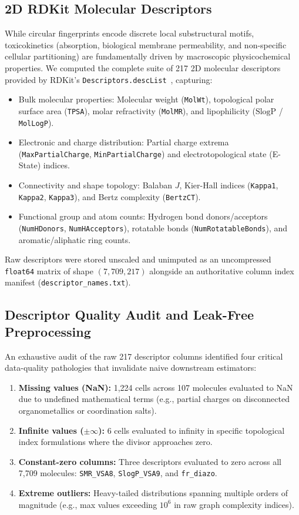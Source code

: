 \subsection{2D RDKit Molecular Descriptors}
\label{subsec:descriptors}
While circular fingerprints encode discrete local substructural motifs, toxicokinetics (absorption, biological membrane permeability, and non-specific cellular partitioning) are fundamentally driven by macroscopic physicochemical properties. We computed the complete suite of 217 2D molecular descriptors provided by RDKit's \texttt{Descriptors.descList}~\cite{landrum2013rdkit}, capturing:
\begin{itemize}
    \item Bulk molecular properties: Molecular weight (\texttt{MolWt}), topological polar surface area (\texttt{TPSA}), molar refractivity (\texttt{MolMR}), and lipophilicity ($\text{SlogP}$ / \texttt{MolLogP}).
    \item Electronic and charge distribution: Partial charge extrema (\texttt{MaxPartialCharge}, \texttt{MinPartialCharge}) and electrotopological state (E-State) indices.
    \item Connectivity and shape topology: Balaban $J$, Kier-Hall indices (\texttt{Kappa1}, \texttt{Kappa2}, \texttt{Kappa3}), and Bertz complexity (\texttt{BertzCT}).
    \item Functional group and atom counts: Hydrogen bond donors/acceptors (\texttt{NumHDonors}, \texttt{NumHAcceptors}), rotatable bonds (\texttt{NumRotatableBonds}), and aromatic/aliphatic ring counts.
\end{itemize}
Raw descriptors were stored unscaled and unimputed as an uncompressed \texttt{float64} matrix of shape $(7{,}709, 217)$ alongside an authoritative column index manifest (\texttt{descriptor\_names.txt}).

\subsection{Descriptor Quality Audit and Leak-Free Preprocessing}
\label{subsec:preprocessing}
An exhaustive audit of the raw 217 descriptor columns identified four critical data-quality pathologies that invalidate naive downstream estimators:
\begin{enumerate}
    \item \textbf{Missing values (NaN):} 1,224 cells across 107 molecules evaluated to NaN due to undefined mathematical terms (e.g., partial charges on disconnected organometallics or coordination salts).
    \item \textbf{Infinite values ($\pm\infty$):} 6 cells evaluated to infinity in specific topological index formulations where the divisor approaches zero.
    \item \textbf{Constant-zero columns:} Three descriptors evaluated to zero across all 7,709 molecules: \texttt{SMR\_VSA8}, \texttt{SlogP\_VSA9}, and \texttt{fr\_diazo}.
    \item \textbf{Extreme outliers:} Heavy-tailed distributions spanning multiple orders of magnitude (e.g., max values exceeding $10^6$ in raw graph complexity indices).
\end{enumerate}

